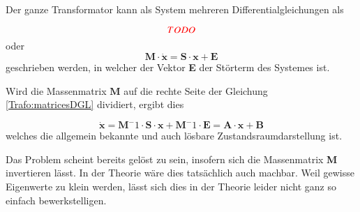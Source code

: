 \begin{refsection}
Der ganze Transformator kann als System mehreren Differentialgleichungen als

\begin{equation}
	\color{red} TODO
\end{equation}
oder 
\begin{equation}
	\textbf{M} \cdot \dot{\textbf{x}} = \textbf{S} \cdot \textbf{x} + \textbf{E}
	\label{Trafo:matricesDGL}
\end{equation}
geschrieben werden, in welcher der Vektor \textbf{E} der Störterm des Systemes ist.

Wird die Massenmatrix $\textbf{M}$ auf die rechte Seite der Gleichung \ref{Trafo:matricesDGL} dividiert, ergibt dies

\begin{equation}
	\dot{\textbf{x}} = \textbf{M}^-1 \cdot \textbf{S} \cdot \textbf{x} + \textbf{M}^-1 \cdot \textbf{E} = \textbf{A} \cdot \textbf{x} + \textbf{B}
\end{equation}
welches die allgemein bekannte und auch lösbare Zustandsraumdarstellung ist.

Das Problem scheint bereits gelöst zu sein, insofern sich die Massenmatrix \textbf{M} invertieren lässt. In der Theorie wäre dies tatsächlich auch machbar. Weil gewisse Eigenwerte zu klein werden, lässt sich dies in der Theorie leider nicht ganz so einfach bewerkstelligen. 

\printbibliography[heading=subbibliography]
\end{refsection}


